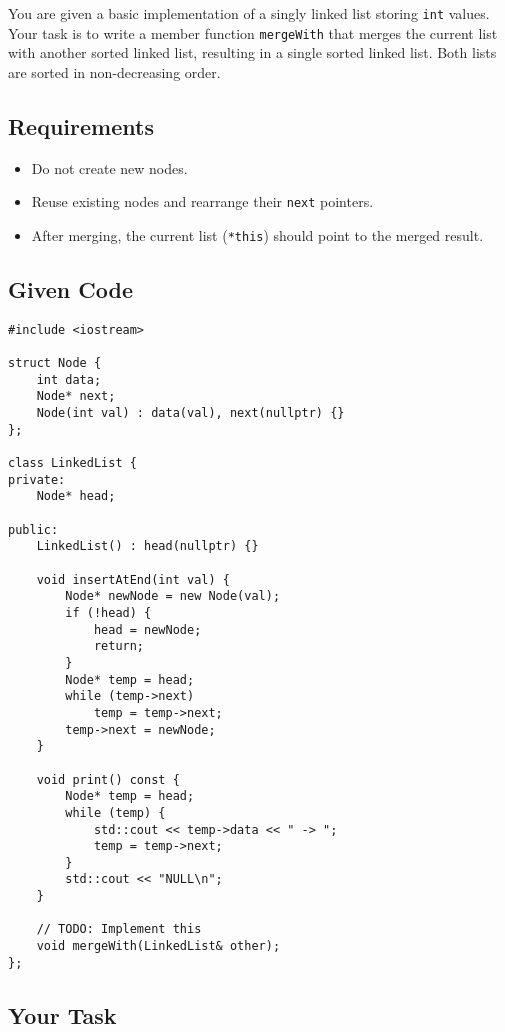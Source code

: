 \documentclass{article}
\begin{document}
You are given a basic implementation of a singly linked list storing \texttt{int} values. Your task is to write a member function \texttt{mergeWith} that merges the current list with another sorted linked list, resulting in a single sorted linked list. Both lists are sorted in non-decreasing order.

\subsection*{Requirements}
\begin{itemize}
  \item Do not create new nodes.
  \item Reuse existing nodes and rearrange their \texttt{next} pointers.
  \item After merging, the current list (\texttt{*this}) should point to the merged result.
\end{itemize}

\subsection*{Given Code}

\begin{lstlisting}[style=cppstyle]
#include <iostream>

struct Node {
    int data;
    Node* next;
    Node(int val) : data(val), next(nullptr) {}
};

class LinkedList {
private:
    Node* head;

public:
    LinkedList() : head(nullptr) {}

    void insertAtEnd(int val) {
        Node* newNode = new Node(val);
        if (!head) {
            head = newNode;
            return;
        }
        Node* temp = head;
        while (temp->next)
            temp = temp->next;
        temp->next = newNode;
    }

    void print() const {
        Node* temp = head;
        while (temp) {
            std::cout << temp->data << " -> ";
            temp = temp->next;
        }
        std::cout << "NULL\n";
    }

    // TODO: Implement this
    void mergeWith(LinkedList& other);
};
\end{lstlisting}

\subsection*{Your Task}
\end{document}

